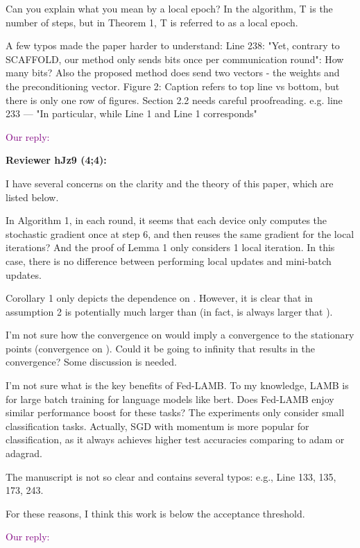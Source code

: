 \documentclass{article}
\begin{document}
Can you explain what you mean by a local epoch? In the algorithm, T is the number of steps, but in Theorem 1, T is referred to as a local epoch.

A few typos made the paper harder to understand: Line 238: "Yet, contrary to SCAFFOLD, our method only sends bits once per communication round": How many bits? Also the proposed method does send two vectors - the weights and the preconditioning vector. Figure 2: Caption refers to top line vs bottom, but there is only one row of figures. Section 2.2 needs careful proofreading. e.g. line 233 --- "In particular, while Line 1 and Line 1 corresponds"


\textcolor{purple}{Our reply:}


\textbf{Reviewer hJz9 (4;4):}

I have several concerns on the clarity and the theory of this paper, which are listed below.

In Algorithm 1, in each round, it seems that each device only computes the stochastic gradient once at step 6, and then reuses the same gradient for the  local iterations? And the proof of Lemma 1 only considers 1 local iteration. In this case, there is no difference between performing local updates and mini-batch updates.

Corollary 1 only depicts the dependence on . However, it is clear that  in assumption 2 is potentially much larger than  (in fact,  is always larger that ).

I'm not sure how the convergence on 
 would imply a convergence to the stationary points (convergence on ). Could it be 
 going to infinity that results in the convergence? Some discussion is needed.

I'm not sure what is the key benefits of Fed-LAMB. To my knowledge, LAMB is for large batch training for language models like bert. Does Fed-LAMB enjoy similar performance boost for these tasks? The experiments only consider small classification tasks. Actually, SGD with momentum is more popular for classification, as it always achieves higher test accuracies comparing to adam or adagrad.

The manuscript is not so clear and contains several typos: e.g., Line 133, 135, 173, 243.

For these reasons, I think this work is below the acceptance threshold.


\textcolor{purple}{Our reply:}
\end{document}
